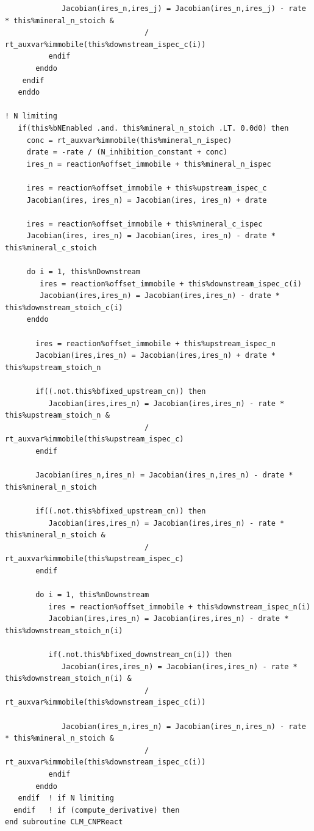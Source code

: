 \documentclass[12pt, a4paper]{article}
\begin{document}
\begin{verbatim}
             Jacobian(ires_n,ires_j) = Jacobian(ires_n,ires_j) - rate * this%mineral_n_stoich &      
                                / rt_auxvar%immobile(this%downstream_ispec_c(i))
          endif
       enddo 
    endif
   enddo 

! N limiting
   if(this%bNEnabled .and. this%mineral_n_stoich .LT. 0.0d0) then
     conc = rt_auxvar%immobile(this%mineral_n_ispec)  
     drate = -rate / (N_inhibition_constant + conc) 
     ires_n = reaction%offset_immobile + this%mineral_n_ispec      

     ires = reaction%offset_immobile + this%upstream_ispec_c      
     Jacobian(ires, ires_n) = Jacobian(ires, ires_n) + drate       

     ires = reaction%offset_immobile + this%mineral_c_ispec      
     Jacobian(ires, ires_n) = Jacobian(ires, ires_n) - drate * this%mineral_c_stoich      

     do i = 1, this%nDownstream
        ires = reaction%offset_immobile + this%downstream_ispec_c(i)      
        Jacobian(ires,ires_n) = Jacobian(ires,ires_n) - drate * this%downstream_stoich_c(i)
     enddo 

       ires = reaction%offset_immobile + this%upstream_ispec_n      
       Jacobian(ires,ires_n) = Jacobian(ires,ires_n) + drate * this%upstream_stoich_n      
       
       if((.not.this%bfixed_upstream_cn)) then
          Jacobian(ires,ires_n) = Jacobian(ires,ires_n) - rate * this%upstream_stoich_n &      
                                / rt_auxvar%immobile(this%upstream_ispec_c)
       endif
       
       Jacobian(ires_n,ires_n) = Jacobian(ires_n,ires_n) - drate * this%mineral_n_stoich      

       if((.not.this%bfixed_upstream_cn)) then
          Jacobian(ires,ires_n) = Jacobian(ires,ires_n) - rate * this%mineral_n_stoich &      
                                / rt_auxvar%immobile(this%upstream_ispec_c)
       endif
       
       do i = 1, this%nDownstream
          ires = reaction%offset_immobile + this%downstream_ispec_n(i)      
          Jacobian(ires,ires_n) = Jacobian(ires,ires_n) - drate * this%downstream_stoich_n(i)      

          if(.not.this%bfixed_downstream_cn(i)) then
             Jacobian(ires,ires_n) = Jacobian(ires,ires_n) - rate * this%downstream_stoich_n(i) &      
                                / rt_auxvar%immobile(this%downstream_ispec_c(i))

             Jacobian(ires_n,ires_n) = Jacobian(ires_n,ires_n) - rate * this%mineral_n_stoich &      
                                / rt_auxvar%immobile(this%downstream_ispec_c(i))
          endif
       enddo 
   endif  ! if N limiting
  endif   ! if (compute_derivative) then
end subroutine CLM_CNPReact

\end{verbatim}

\clearpage


\end{document}
